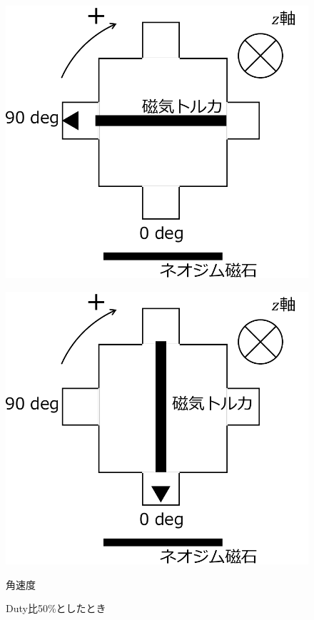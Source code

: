 \begin{figure}[h]
	\centering
	\begin{minipage}{0.3\columnwidth}
	  \centering
	  \includegraphics[width=\columnwidth]{./figure/90deg-crop.pdf}
	  \label{fig:90deg}
	\end{minipage}
	\hspace{5mm}
	\begin{minipage}{0.3\columnwidth}
	  \centering
	  \includegraphics[width=\columnwidth]{./figure/0deg-crop.pdf}
	  \caption{角速度}
	  \label{fig:0deg}
	\end{minipage}
	\caption{Duty比50\%としたとき}
	\label{fig:method}
  \end{figure}

